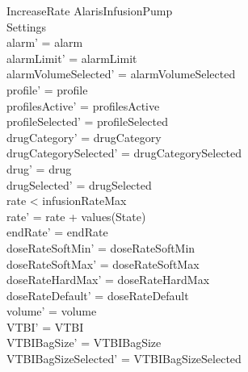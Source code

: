 \begin{schema}{IncreaseRate}
	\Delta AlarisInfusionPump\\
	Settings\\
	\where
	alarm' = alarm\\
	alarmLimit' = alarmLimit\\
	alarmVolumeSelected' = alarmVolumeSelected\\
	profile' = profile\\
	profilesActive' = profilesActive\\  
	  profileSelected' = profileSelected\\
	drugCategory' = drugCategory\\ drugCategorySelected' = drugCategorySelected\\
	drug' = drug\\ drugSelected' = drugSelected\\
	rate < infusionRateMax\\
	rate' = rate + values(State)\\
	endRate' = endRate\\
	doseRateSoftMin' = doseRateSoftMin\\
	doseRateSoftMax' = doseRateSoftMax\\
	doseRateHardMax' = doseRateHardMax\\
	doseRateDefault' = doseRateDefault\\
	volume' = volume\\
	VTBI' = VTBI\\
	VTBIBagSize' = VTBIBagSize\\ VTBIBagSizeSelected' = VTBIBagSizeSelected\\

\end{schema}
